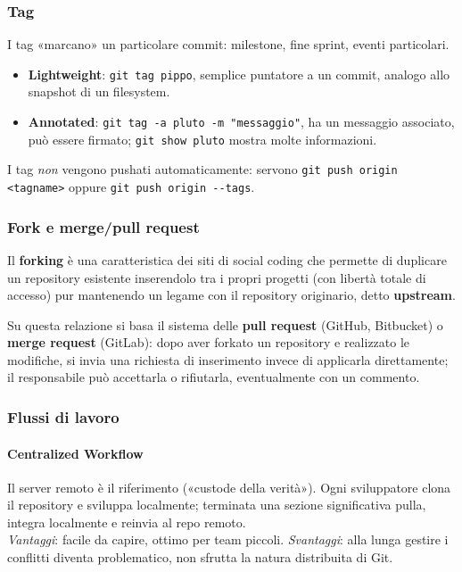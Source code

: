 \documentclass[a4paper,12pt]{article}
\begin{document}
\subsubsection{Tag}

I tag «marcano» un particolare commit: milestone, fine sprint, eventi particolari.
\begin{itemize}
  \item \textbf{Lightweight}: \verb|git tag pippo|, semplice puntatore a un commit,
        analogo allo snapshot di un filesystem.
  \item \textbf{Annotated}: \verb|git tag -a pluto -m "messaggio"|, ha un messaggio
        associato, può essere firmato; \verb|git show pluto| mostra molte informazioni.
\end{itemize}
I tag \emph{non} vengono pushati automaticamente: servono
\verb|git push origin <tagname>| oppure \verb|git push origin --tags|.

\subsubsection{Fork e merge/pull request}

Il \textbf{forking} è una caratteristica dei siti di social coding che permette di
duplicare un repository esistente inserendolo tra i propri progetti (con libertà totale
di accesso) pur mantenendo un legame con il repository originario, detto
\textbf{upstream}.

Su questa relazione si basa il sistema delle \textbf{pull request} (GitHub, Bitbucket) o
\textbf{merge request} (GitLab): dopo aver forkato un repository e realizzato le
modifiche, si invia una richiesta di inserimento invece di applicarla direttamente; il
responsabile può accettarla o rifiutarla, eventualmente con un commento.

\subsubsection{Flussi di lavoro}

\paragraph{Centralized Workflow} Il server remoto è il riferimento («custode della
verità»). Ogni sviluppatore clona il repository e sviluppa localmente; terminata una
sezione significativa pulla, integra localmente e reinvia al repo remoto.\\
\emph{Vantaggi}: facile da capire, ottimo per team piccoli.
\emph{Svantaggi}: alla lunga gestire i conflitti diventa problematico, non sfrutta la
natura distribuita di Git.
\end{document}
